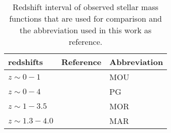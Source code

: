 \begin{table}
	\centering
	\caption{
		Redshift interval of observed stellar mass functions that are used for comparison and the abbreviation used in this work as reference.
		}
	\label{tab:obs_smf}
	\begin{tabular}[c]{l l l}
			redshifts		        & Reference						& 	Abbreviation \\
		\hline
			$z \sim 0 - 1 $			& \cite{OBS_moustakas}			& 	MOU	\\				
%
			$z \sim 0 - 4 $			& \cite{OBS_perez-gonzalez}		& 	PG \\			
%
			$z \sim 1 - 3.5 $		& \cite{OBS_mortlock}			& 	MOR	\\
%
			$z \sim 1.3 - 4.0$		& \cite{OBS_marchesini}			&   MAR  \\
%
	\end{tabular}
\end{table}